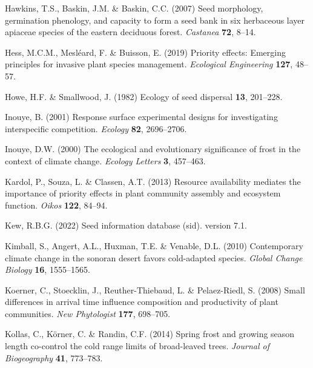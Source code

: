 \documentclass{article}[11pt]
\begin{document}
\begin{thebibliography}{62}
Hawkins, T.S., Baskin, J.M. \& Baskin, C.C. (2007) Seed morphology, germination
  phenology, and capacity to form a seed bank in six herbaceous layer apiaceae
  species of the eastern deciduous forest. \emph{Castanea} \textbf{72}, 8--14.

Hess, M.C.M., Mesl{\'e}ard, F. \& Buisson, E. (2019) Priority effects: Emerging
  principles for invasive plant species management. \emph{Ecological
  Engineering} \textbf{127}, 48--57.

Howe, H.F. \& Smallwood, J. (1982) Ecology of seed dispersal \textbf{13},
  201--228.

Inouye, B. ({2001}) {Response surface experimental designs for investigating
  interspecific competition}. \emph{Ecology} \textbf{{82}}, {2696--2706}.

Inouye, D.W. (2000) The ecological and evolutionary significance of frost in
  the context of climate change. \emph{Ecology Letters} \textbf{3}, 457--463.

Kardol, P., Souza, L. \& Classen, A.T. ({2013}) {Resource availability mediates
  the importance of priority effects in plant community assembly and ecosystem
  function}. \emph{Oikos} \textbf{{122}}, {84--94}.

Kew, R.B.G. (2022) Seed information database (sid). version 7.1.

Kimball, S., Angert, A.L., Huxman, T.E. \& Venable, D.L. (2010) Contemporary
  climate change in the sonoran desert favors cold-adapted species.
  \emph{Global Change Biology} \textbf{16}, 1555--1565.

Koerner, C., Stoecklin, J., Reuther-Thiebaud, L. \& Pelaez-Riedl, S. ({2008})
  {Small differences in arrival time influence composition and productivity of
  plant communities}. \emph{New Phytologist} \textbf{{177}}, {698--705}.

Kollas, C., K{\"o}rner, C. \& Randin, C.F. (2014) Spring frost and growing
  season length co-control the cold range limits of broad-leaved trees.
  \emph{Journal of Biogeography} \textbf{41}, 773--783.


\end{thebibliography}
\end{document}
